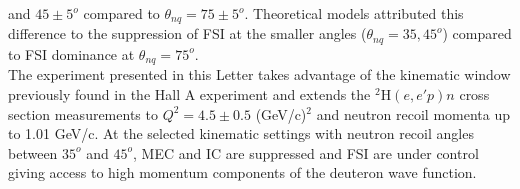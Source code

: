 and $45\pm5^{o}$ compared to  $\theta_{nq}=75\pm5^{o}$. Theoretical models attributed this difference  to the suppression of FSI at the smaller angles ($\theta_{nq}=35, 45^{o}$) compared to FSI
dominance at $\theta_{nq}=75^{o}$\cite{PhysRevLett.107.262501}. \\
\indent The experiment presented in this Letter takes advantage of the kinematic window previously found in the Hall A experiment and extends the $^{2}\mathrm{H}(e,e'p)n$ cross section measurements
to $Q^{2}=4.5\pm0.5$ (GeV/c)$^{2}$ and neutron recoil momenta up to 1.01 GeV/c. At the selected kinematic settings with neutron recoil angles between $35^{o}$ and $45^{o}$, MEC and IC are
suppressed and FSI are under control giving access to high momentum components of the deuteron wave function.


